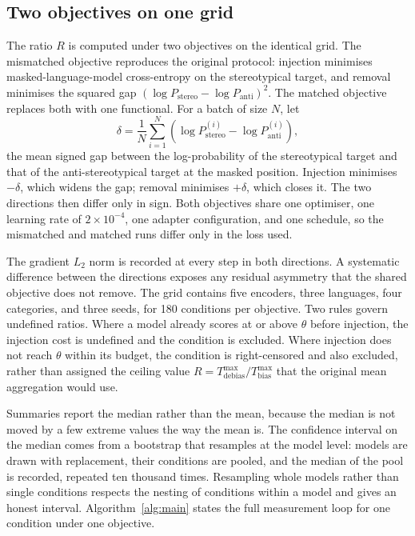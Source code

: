 \documentclass[Afour,sageh,times]{sagej}
\begin{document}
\subsection{Two objectives on one grid}

The ratio $R$ is computed under two objectives on the identical grid. The mismatched objective reproduces the original protocol: injection minimises masked-language-model cross-entropy on the stereotypical target, and removal minimises the squared gap $(\log P_{\mathrm{stereo}} - \log P_{\mathrm{anti}})^2$. The matched objective replaces both with one functional. For a batch of size $N$, let
\begin{equation}
\delta = \frac{1}{N}\sum_{i=1}^{N}\left(\log P_{\mathrm{stereo}}^{(i)} - \log P_{\mathrm{anti}}^{(i)}\right),
\label{eq:delta}
\end{equation}
the mean signed gap between the log-probability of the stereotypical target and that of the anti-stereotypical target at the masked position. Injection minimises $-\delta$, which widens the gap; removal minimises $+\delta$, which closes it. The two directions then differ only in sign. Both objectives share one optimiser, one learning rate of $2\times10^{-4}$, one adapter configuration, and one schedule, so the mismatched and matched runs differ only in the loss used.

The gradient $L_2$ norm is recorded at every step in both directions. A systematic difference between the directions exposes any residual asymmetry that the shared objective does not remove. The grid contains five encoders, three languages, four categories, and three seeds, for 180 conditions per objective. Two rules govern undefined ratios. Where a model already scores at or above $\theta$ before injection, the injection cost is undefined and the condition is excluded. Where injection does not reach $\theta$ within its budget, the condition is right-censored and also excluded, rather than assigned the ceiling value $R = T_{\mathrm{debias}}^{\max}/T_{\mathrm{bias}}^{\max}$ that the original mean aggregation would use.

Summaries report the median rather than the mean, because the median is not moved by a few extreme values the way the mean is. The confidence interval on the median comes from a bootstrap that resamples at the model level: models are drawn with replacement, their conditions are pooled, and the median of the pool is recorded, repeated ten thousand times. Resampling whole models rather than single conditions respects the nesting of conditions within a model and gives an honest interval. Algorithm~\ref{alg:main} states the full measurement loop for one condition under one objective.
\end{document}
